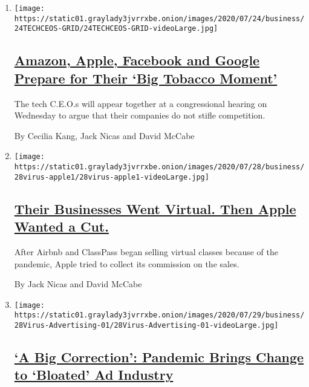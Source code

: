 \begin{enumerate}
\def\labelenumi{\arabic{enumi}.}
\item
  \texttt{[image: https://static01.graylady3jvrrxbe.onion/images/2020/07/24/business/24TECHCEOS-GRID/24TECHCEOS-GRID-videoLarge.jpg]}

  \hypertarget{amazon-apple-facebook-and-google-prepare-for-their-big-tobacco-moment}{%
  \subsection{\texorpdfstring{\href{/2020/07/28/technology/amazon-apple-facebook-google-antitrust-hearing.html}{Amazon,
  Apple, Facebook and Google Prepare for Their `Big Tobacco
  Moment'}}{Amazon, Apple, Facebook and Google Prepare for Their `Big Tobacco Moment'}}\label{amazon-apple-facebook-and-google-prepare-for-their-big-tobacco-moment}}

  The tech C.E.O.s will appear together at a congressional hearing on
  Wednesday to argue that their companies do not stifle competition.

  By Cecilia Kang, Jack Nicas and David McCabe
\item
  \texttt{[image: https://static01.graylady3jvrrxbe.onion/images/2020/07/28/business/28virus-apple1/28virus-apple1-videoLarge.jpg]}

  \hypertarget{their-businesses-went-virtual-then-apple-wanted-a-cut}{%
  \subsection{\texorpdfstring{\href{/2020/07/28/technology/apple-app-store-airbnb-classpass.html}{Their
  Businesses Went Virtual. Then Apple Wanted a
  Cut.}}{Their Businesses Went Virtual. Then Apple Wanted a Cut.}}\label{their-businesses-went-virtual-then-apple-wanted-a-cut}}

  After Airbnb and ClassPass began selling virtual classes because of
  the pandemic, Apple tried to collect its commission on the sales.

  By Jack Nicas and David McCabe
\item
  \texttt{[image: https://static01.graylady3jvrrxbe.onion/images/2020/07/29/business/28Virus-Advertising-01/28Virus-Advertising-01-videoLarge.jpg]}

  \hypertarget{a-big-correction-pandemic-brings-change-to-bloated-ad-industry}{%
  \subsection{\texorpdfstring{\href{/2020/07/28/business/media/coronavirus-pandemic-advertising-industry.html}{`A
  Big Correction': Pandemic Brings Change to `Bloated' Ad
  Industry}}{`A Big Correction': Pandemic Brings Change to `Bloated' Ad Industry}}\label{a-big-correction-pandemic-brings-change-to-bloated-ad-industry}}


\end{enumerate}
